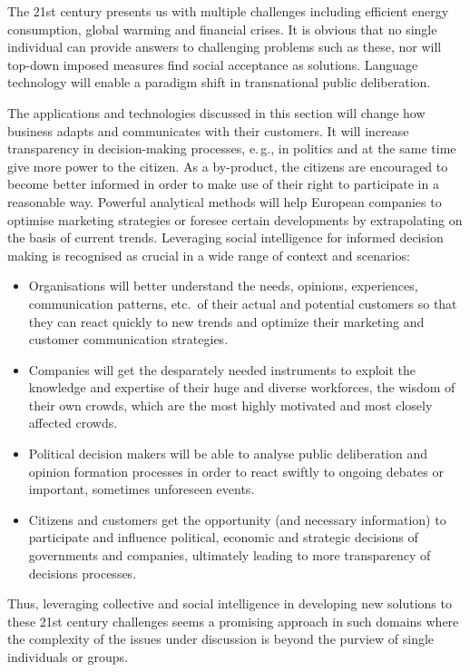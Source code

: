 \documentclass[10pt, plain]{../../metanetpaper}
\begin{document}
\begin{multicols}{2}
The 21st century presents us with multiple challenges including efficient energy consumption, global warming and financial crises. It is obvious that no single individual can provide answers to challenging problems such as these, nor will top-down imposed measures find social acceptance as solutions. Language technology will enable a paradigm shift in transnational public deliberation.
 
The applications and technologies discussed in this section will change how business adapts and communicates with their customers. It will increase transparency in decision-making processes, e.\,g., in politics and at the same time give more power to the citizen. As a by-product, the citizens are encouraged to become better informed in order to make use of their right to participate in a reasonable way. Powerful analytical methods will help European companies to optimise marketing strategies or foresee certain developments by extrapolating on the basis of current trends. Leveraging social intelligence for informed decision making is recognised as crucial in a wide range of context and scenarios:

\begin{itemize}
\item Organisations will better understand the needs, opinions, experiences, communication patterns, etc.~of their actual and potential customers so that they can react quickly to new trends and optimize their marketing and customer communication strategies.
\item Companies will get the desparately needed instruments to exploit the knowledge and expertise of their huge and diverse workforces, the wisdom of their own crowds, which are the most highly motivated and most closely affected crowds.
\item Political decision makers will be able to analyse public deliberation and opinion formation processes in order to react swiftly to ongoing debates or important, sometimes unforeseen events.
\item Citizens and customers get the opportunity (and necessary information) to participate and influence political, economic and strategic decisions of governments and companies, ultimately leading to more transparency of decisions processes.
\end{itemize}

Thus, leveraging collective and social intelligence in developing new solutions to these 21st century challenges seems a promising approach in such domains where the complexity of the issues under discussion is beyond the purview of single individuals or groups.


\end{multicols}
\end{document}
